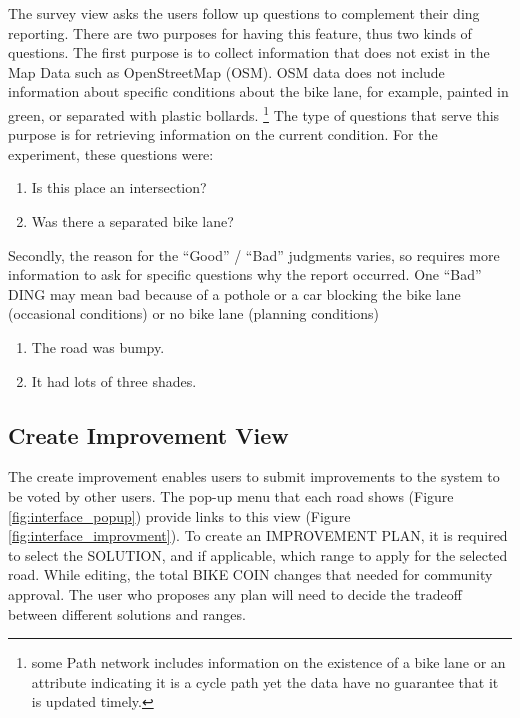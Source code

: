 The survey view asks the users follow up questions to complement their ding
reporting. There are two purposes for having this feature, thus two kinds
of questions. The first purpose is to collect information that does not
exist in the Map Data such as OpenStreetMap (OSM). OSM data does not
include information about specific conditions about the bike lane, for
example, painted in green, or separated with plastic bollards.
\footnote{some Path network includes information on the existence of a bike
  lane or an attribute indicating it is a cycle path yet the data have no
guarantee that it is updated timely.} 
The type of questions that serve this purpose is for retrieving information
on the current condition. For the experiment, these questions were:

\begin{enumerate}
  \item Is this place an intersection?
  \item Was there a separated bike lane?
\end{enumerate}

Secondly, the reason for the ``Good'' / ``Bad'' judgments varies,
so requires more information to ask for specific questions why the
report occurred.
One ``Bad'' DING may mean bad because of a pothole or a car blocking the
bike lane (occasional conditions) or no bike lane (planning conditions)

\begin{enumerate}
  \item The road was bumpy.
  \item It had lots of three shades.
\end{enumerate}

\subsection{Create Improvement View}

The create improvement enables users to submit improvements to the system
to be voted by other users.
The pop-up menu that each road shows (Figure \ref{fig:interface_popup})
provide links to this view (Figure \ref{fig:interface_improvment}).
To create an IMPROVEMENT PLAN, it is required to select the SOLUTION, and if
applicable, which range to apply for the selected road. While editing, the
total BIKE COIN changes that needed for community approval. The user who
proposes any plan will need to decide the tradeoff between different
solutions and ranges.


